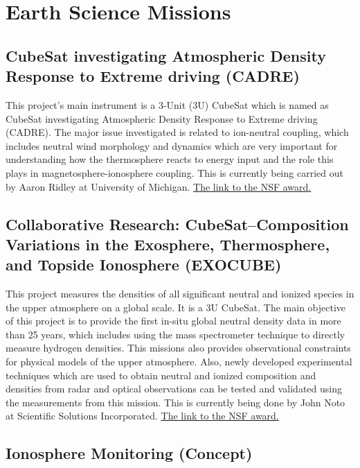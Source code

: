 \section{Earth Science Missions}

\subsection{CubeSat investigating Atmospheric Density Response to Extreme driving (CADRE)}
This project's  main instrument is a 3-Unit (3U) CubeSat which is named as CubeSat investigating Atmospheric Density Response to Extreme driving (CADRE). The major issue investigated is related to ion-neutral coupling, which includes neutral wind morphology and dynamics which are very important for understanding how the thermosphere reacts to energy input and the role this plays in magnetosphere-ionosphere coupling. This is currently being carried out by Aaron Ridley at University of Michigan. \href{http://nsf.gov/awardsearch/showAward?AWD_ID=1042815&HistoricalAwards=false}{The link to the NSF award.}

\subsection{Collaborative Research: CubeSat--Composition Variations in the Exosphere, Thermosphere, and Topside Ionosphere (EXOCUBE)}

This project measures the densities of all significant neutral and ionized species in the upper atmosphere on a global scale. It is a 3U CubeSat. The main objective of this project is to provide the first in-situ global neutral density data in more than 25 years, which includes using the mass spectrometer technique to directly measure hydrogen densities. This missions also provides observational constraints for physical models of the upper atmosphere. Also, newly developed experimental techniques which are used to obtain neutral and ionized composition and densities from radar and optical observations can be tested and validated using the measurements from this mission. This is currently being done by John Noto at Scientific Solutions Incorporated. \href{http://nsf.gov/awardsearch/showAward?AWD_ID=1042837&HistoricalAwards=false}{The link to the NSF award.}



\subsection{Ionosphere Monitoring (Concept)}

